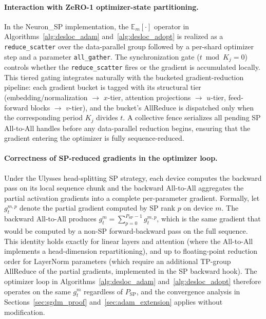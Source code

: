 \documentclass{article}
\begin{document}
\paragraph{Interaction with ZeRO-1 optimizer-state partitioning.}
In the Neuron\_SP implementation, the $\mathbb{E}_m[\cdot]$ operator in
Algorithms~\ref{alg:desloc_adam} and~\ref{alg:desloc_adopt} is realized as a
\texttt{reduce\_scatter} over the data-parallel group followed by a per-shard
optimizer step and a parameter \texttt{all\_gather}.
The synchronization gate ($t \bmod K_j = 0$) controls whether the
\texttt{reduce\_scatter} fires or the gradient is accumulated locally.
This tiered gating integrates naturally with the bucketed gradient-reduction
pipeline: each gradient bucket is tagged with its structural tier
(embedding/normalization $\to$ $x$-tier, attention projections $\to$ $u$-tier,
feed-forward blocks $\to$ $v$-tier), and the bucket's AllReduce is dispatched
only when the corresponding period $K_j$ divides $t$.
A collective fence serializes all pending SP All-to-All handles before any
data-parallel reduction begins, ensuring that the gradient entering the
optimizer is fully sequence-reduced.

\paragraph{Correctness of SP-reduced gradients in the optimizer loop.}
Under the Ulysses head-splitting SP strategy, each device computes the backward
pass on its local sequence chunk and the backward All-to-All aggregates the
partial activation gradients into a complete per-parameter gradient.
Formally, let $g^{m,p}_t$ denote the partial gradient computed by SP rank $p$
on device $m$. The backward All-to-All produces
$g^m_t = \sum_{p=0}^{P_{\text{SP}}-1} g^{m,p}_t$, which is the same gradient
that would be computed by a non-SP forward-backward pass on the full sequence.
This identity holds exactly for linear layers and attention (where the All-to-All
implements a head-dimension repartitioning), and up to floating-point reduction
order for LayerNorm parameters (which require an additional TP-group AllReduce
of the partial gradients, implemented in the SP backward hook).
The optimizer loop in Algorithms~\ref{alg:desloc_adam} and~\ref{alg:desloc_adopt}
therefore operates on the same $g^m_t$ regardless of $P_{\text{SP}}$, and the
convergence analysis in Sections~\ref{sec:sgdm_proof} and~\ref{sec:adam_extension}
applies without modification.
\end{document}

